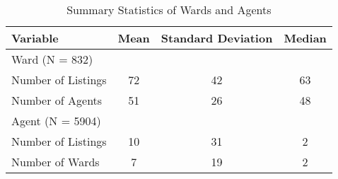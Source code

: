 \documentclass[12pt]{article}
\begin{document}
\begin{table}[ht]
    \centering
    \caption{Summary Statistics of Wards and Agents}
    \begin{tabular}{@{}lccc@{}} \toprule
        Variable                    & Mean  & Standard Deviation    & Median \\ \midrule \addlinespace
        Ward (N = 832) \\ \cmidrule(r{2cm}){1-1}
        Number of Listings          & 72    & 42                    & 63 \\
        Number of Agents            & 51    & 26                    & 48 \\ \addlinespace
        Agent (N = 5904) \\ \cmidrule(r{2cm}){1-1}
        Number of Listings          & 10    & 31                    & 2 \\
        Number of Wards             & 7     & 19                    & 2 \\ \bottomrule
    \end{tabular}
\end{table}
    
\end{document}

